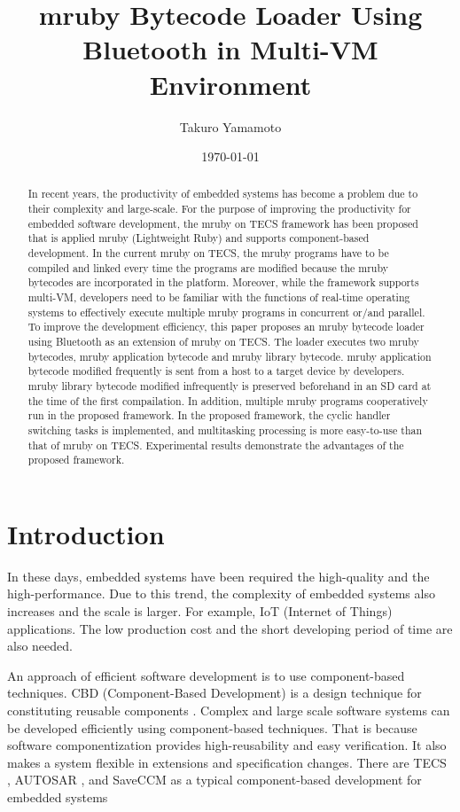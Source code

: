 \documentclass[conference,compsoc]{IEEEtran}
\title{mruby Bytecode Loader Using Bluetooth in Multi-VM Environment}
\author{Takuro Yamamoto}
\date{\today}
\begin{document}
\maketitle
\begin{abstract}
In recent years, the productivity of embedded systems has become a problem due to their complexity and large-scale.
For the purpose of improving the productivity for embedded software development, the mruby on TECS framework has been proposed that is applied mruby (Lightweight Ruby) and supports component-based development.
In the current mruby on TECS, the mruby programs have to be compiled and linked every time the programs are modified because the mruby bytecodes are incorporated in the platform.
Moreover, while the framework supports multi-VM, developers need to be familiar with the functions of real-time operating systems to effectively execute multiple mruby programs in concurrent or/and parallel.
To improve the development efficiency, this paper proposes an mruby bytecode loader using Bluetooth as an extension of mruby on TECS.
The loader executes two mruby bytecodes, mruby application bytecode and mruby library bytecode.
mruby application bytecode modified frequently is sent from a host to a target device by developers.
mruby library bytecode modified infrequently is preserved beforehand in an SD card at the time of the first compailation.
In addition, multiple mruby programs cooperatively run in the proposed framework.
In the proposed framework, the cyclic handler switching tasks is implemented, and multitasking processing is more easy-to-use than that of mruby on TECS.
Experimental results demonstrate the advantages of the proposed framework.
\end{abstract}
\section{Introduction}
In these days, embedded systems have been required the high-quality and the high-performance.
Due to this trend, the complexity of embedded systems also increases and the scale is larger.
For example, IoT (Internet of Things) applications.
The low production cost and the short developing period of time are also needed.

An approach of efficient software development is to use component-based techniques.
CBD (Component-Based Development) is a design technique for constituting reusable components \cite{par:Crnkovic}.
Complex and large scale software systems can be developed efficiently using component-based techniques.
That is because software componentization provides high-reusability and easy verification.
It also makes a system flexible in extensions and specification changes.
There are TECS \cite{par:TECS}, AUTOSAR \cite{url:AUTOSAR}, and SaveCCM \cite{par:SAVEapproach} as a typical component-based development for embedded systems 
\end{document}
